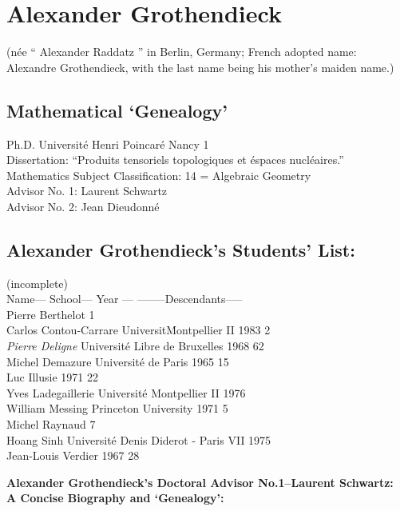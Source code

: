 \documentclass[12pt]{article}
\theoremstyle{plain}
\theoremstyle{definition}
\numberwithin{equation}{section}
\begin{document}
\section{Alexander Grothendieck} 
(n\'ee `` Alexander Raddatz '' in Berlin, Germany;
French adopted name: Alexandre Grothendieck,
with the last name being his mother's maiden name.)

\bigbreak
\subsection{Mathematical `Genealogy'}


Ph.D. Universit\'e Henri Poincar\'e Nancy 1    \\
Dissertation: ``Produits tensoriels topologiques et \'espaces nucl\'eaires.'' \\
Mathematics Subject Classification: 14 = Algebraic Geometry \\
Advisor No. 1: Laurent Schwartz \\
Advisor No. 2: Jean Dieudonn\'e \\

\subsection{Alexander Grothendieck's Students' List:}
(incomplete)\\
Name--- School--- Year ---                 --------Descendants----- \\
Pierre Berthelot                                     1 \\
Carlos Contou-Carrare Universit\' Montpellier II 1983 2 \\
{\em Pierre Deligne} Universit\'e Libre de Bruxelles 1968 62 \\
Michel Demazure Universit\'e de Paris 1965 15 \\
Luc Illusie  1971 22 \\
Yves Ladegaillerie Universit\'e Montpellier II 1976  \\
William Messing Princeton University 1971 5 \\
Michel Raynaud    7 \\
Hoang Sinh Universit\'e Denis Diderot - Paris VII 1975  \\
Jean-Louis Verdier  1967 28 


\bigbreak
\textbf{Alexander Grothendieck's Doctoral Advisor No.1--Laurent Schwartz: \\
 A Concise Biography and `Genealogy':}\\
\end{document}
